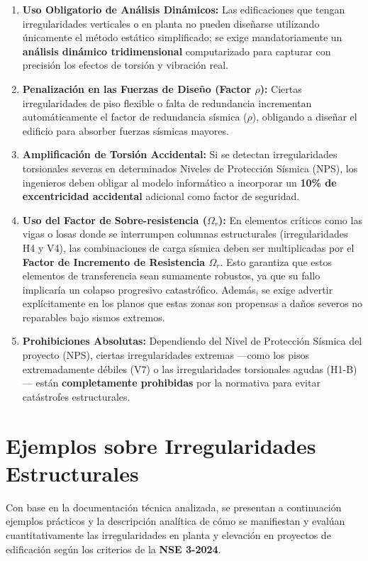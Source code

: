 \documentclass[14pt,letterpaper]{extarticle}
\begin{document}
	\begin{enumerate}
		\item \textbf{Uso Obligatorio de Análisis Dinámicos:} Las edificaciones que tengan irregularidades verticales o en planta no pueden diseñarse utilizando únicamente el método estático simplificado; se exige mandatoriamente un \textbf{análisis dinámico tridimensional} computarizado para capturar con precisión los efectos de torsión y vibración real.
		\item \textbf{Penalización en las Fuerzas de Diseño (Factor $\rho$):} Ciertas irregularidades de piso flexible o falta de redundancia incrementan automáticamente el factor de redundancia sísmica ($\rho$), obligando a diseñar el edificio para absorber fuerzas sísmicas mayores.
		\item \textbf{Amplificación de Torsión Accidental:} Si se detectan irregularidades torsionales severas en determinados Niveles de Protección Sísmica (NPS), los ingenieros deben obligar al modelo informático a incorporar un \textbf{10\% de excentricidad accidental} adicional como factor de seguridad.
		\item \textbf{Uso del Factor de Sobre-resistencia ($\Omega_r$):} En elementos críticos como las vigas o losas donde se interrumpen columnas estructurales (irregularidades H4 y V4), las combinaciones de carga sísmica deben ser multiplicadas por el \textbf{Factor de Incremento de Resistencia $\Omega_r$}. Esto garantiza que estos elementos de transferencia sean sumamente robustos, ya que su fallo implicaría un colapso progresivo catastrófico. Además, se exige advertir explícitamente en los planos que estas zonas son propensas a daños severos no reparables bajo sismos extremos.
		\item \textbf{Prohibiciones Absolutas:} Dependiendo del Nivel de Protección Sísmica del proyecto (NPS), ciertas irregularidades extremas —como los pisos extremadamente débiles (V7) o las irregularidades torsionales agudas (H1-B)— están \textbf{completamente prohibidas} por la normativa para evitar catástrofes estructurales.
	\end{enumerate}
	
	
	\section{Ejemplos sobre Irregularidades Estructurales }
	
	Con base en la documentación técnica analizada, se presentan a continuación ejemplos prácticos y la descripción analítica de cómo se manifiestan y evalúan cuantitativamente las irregularidades en planta y elevación en proyectos de edificación según los criterios de la \textbf{NSE 3-2024}.
	
\end{document}
